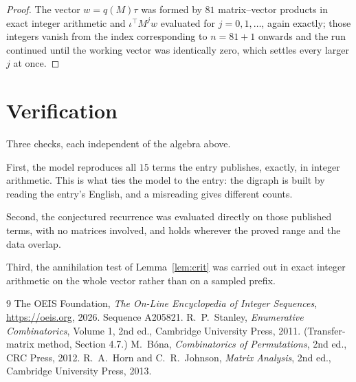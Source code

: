 \documentclass[11pt,a4paper]{article}
\theoremstyle{plain}
\theoremstyle{definition}
\begin{document}
\begin{proof}
The vector $w=q(M)\tau$ was formed by $81$ matrix--vector products in exact integer
arithmetic and $\iota^{\!\top}M^{j}w$ evaluated for $j=0,1,\dots$, again exactly; those
integers vanish from the index corresponding to $n=81+1$ onwards and the run continued
until the working vector was identically zero, which settles every larger $j$ at once.
\end{proof}

\section{Verification}

Three checks, each independent of the algebra above.

First, the model reproduces all $15$ terms the entry publishes, exactly, in integer
arithmetic. This is what ties the model to the entry: the digraph is built by reading the
entry's English, and a misreading gives different counts.

Second, the conjectured recurrence was evaluated directly on those published terms, with no
matrices involved, and holds wherever the proved range and the data overlap.

Third, the annihilation test of Lemma~\ref{lem:crit} was carried out in exact integer
arithmetic on the whole vector rather than on a sampled prefix.

\begin{thebibliography}{9}
 The OEIS Foundation, \emph{The On-Line Encyclopedia of Integer
Sequences}, \url{https://oeis.org}, 2026. Sequence A205821.
 R.~P.~Stanley, \emph{Enumerative Combinatorics}, Volume 1, 2nd ed.,
Cambridge University Press, 2011. (Transfer-matrix method, Section 4.7.)
 M.~B\'ona, \emph{Combinatorics of Permutations}, 2nd ed., CRC
Press, 2012.
 R.~A.~Horn and C.~R.~Johnson, \emph{Matrix Analysis}, 2nd ed., Cambridge
University Press, 2013.
\end{thebibliography}
\end{document}
